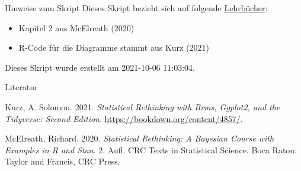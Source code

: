 \documentclass[
  ngerman,
  ignorenonframetext,
]{beamer}
\providecommand{\tightlist}{%
  \setlength{\itemsep}{0pt}\setlength{\parskip}{0pt}}
\newlength{\cslhangindent}
\newenvironment{CSLReferences}[2] %
 {%
  \setlength{\parindent}{0pt}
  \ifodd #1 \everypar{\setlength{\hangindent}{\cslhangindent}}\ignorespaces\fi
  \ifnum #2 > 0
  \setlength{\parskip}{#2\baselineskip}
  \fi
 }%
 {}
\begin{document}
\begin{frame}{Hinweise zum Skript}
\protect\hypertarget{hinweise-zum-skript}{}
Dieses Skript bezieht sich auf folgende
\protect\hyperlink{literatur}{Lehrbücher}:

\begin{itemize}
\tightlist
\item
  Kapitel 2 aus McElreath (2020)
\item
  R-Code für die Diagramme stammt aus Kurz (2021)
\end{itemize}

Dieses Skript wurde erstellt am 2021-10-06 11:03:04.
\end{frame}

\begin{frame}{Literatur}
\protect\hypertarget{literatur}{}
\hypertarget{refs}{}
\begin{CSLReferences}{1}{0}
\leavevmode{}%
Kurz, A. Solomon. 2021. \emph{Statistical Rethinking with Brms, Ggplot2,
and the Tidyverse: {Second} Edition}.
\url{https://bookdown.org/content/4857/}.

\leavevmode{}%
McElreath, Richard. 2020. \emph{Statistical Rethinking: A {Bayesian}
Course with Examples in {R} and {Stan}}. 2. Aufl. {CRC} Texts in
Statistical Science. {Boca Raton}: {Taylor and Francis, CRC Press}.

\end{CSLReferences}
\end{frame}
\end{document}
